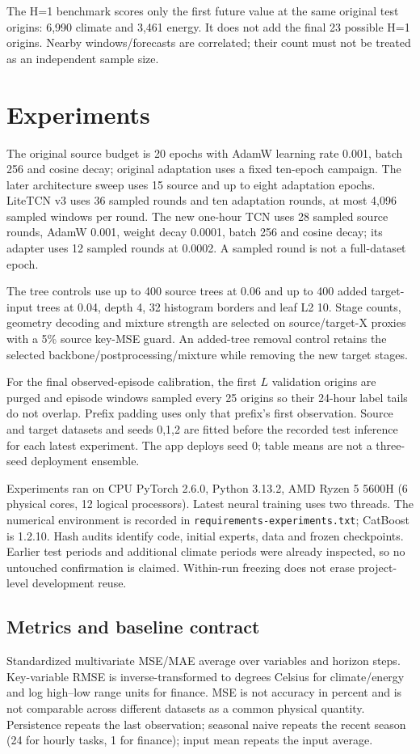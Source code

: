 \documentclass[twoside,english]{article}
\begin{document}
The H=1 benchmark scores only the first future value at the same original test origins: 6,990 climate and 3,461 energy. It does not add the final 23 possible H=1 origins. Nearby windows/forecasts are correlated; their count must not be treated as an independent sample size.

\section{Experiments}\label{sec:exp}
The original source budget is 20 epochs with AdamW learning rate 0.001, batch 256 and cosine decay; original adaptation uses a fixed ten-epoch campaign. The later architecture sweep uses 15 source and up to eight adaptation epochs. LiteTCN v3 uses 36 sampled rounds and ten adaptation rounds, at most 4,096 sampled windows per round. The new one-hour TCN uses 28 sampled source rounds, AdamW 0.001, weight decay 0.0001, batch 256 and cosine decay; its adapter uses 12 sampled rounds at 0.0002. A sampled round is not a full-dataset epoch.

The tree controls use up to 400 source trees at 0.06 and up to 400 added target-input trees at 0.04, depth 4, 32 histogram borders and leaf L2 10. Stage counts, geometry decoding and mixture strength are selected on source/target-X proxies with a 5\% source key-MSE guard. An added-tree removal control retains the selected backbone/postprocessing/mixture while removing the new target stages.

For the final observed-episode calibration, the first $L$ validation origins are purged and episode windows sampled every 25 origins so their 24-hour label tails do not overlap. Prefix padding uses only that prefix's first observation. Source and target datasets and seeds 0,1,2 are fitted before the recorded test inference for each latest experiment. The app deploys seed 0; table means are not a three-seed deployment ensemble.

Experiments ran on CPU PyTorch 2.6.0, Python 3.13.2, AMD Ryzen 5 5600H (6 physical cores, 12 logical processors). Latest neural training uses two threads. The numerical environment is recorded in \texttt{requirements-experiments.txt}; CatBoost is 1.2.10. Hash audits identify code, initial experts, data and frozen checkpoints. Earlier test periods and additional climate periods were already inspected, so no untouched confirmation is claimed. Within-run freezing does not erase project-level development reuse.

\subsection{Metrics and baseline contract}
Standardized multivariate MSE/MAE average over variables and horizon steps. Key-variable RMSE is inverse-transformed to degrees Celsius for climate/energy and log high--low range units for finance. MSE is not accuracy in percent and is not comparable across different datasets as a common physical quantity. Persistence repeats the last observation; seasonal naive repeats the recent season (24 for hourly tasks, 1 for finance); input mean repeats the input average.
\end{document}
